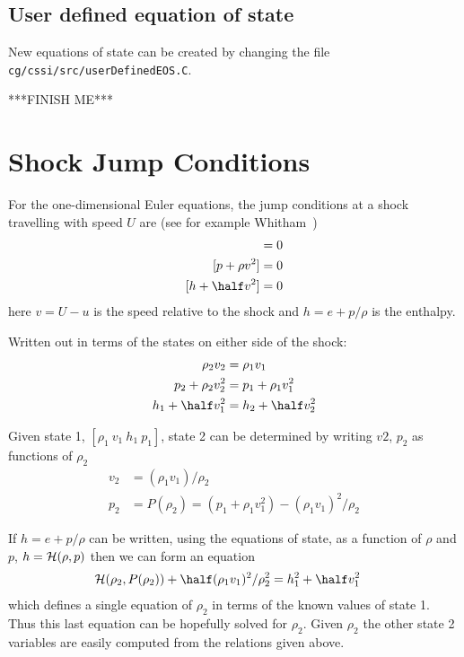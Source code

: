 \documentclass{article}
\begin{document}
\subsection{User defined equation of state} \label{sec:userDefinedEOS}

New equations of state can be created by changing the file {\tt cg/cssi/src/userDefinedEOS.C}.

***FINISH ME***



\section{Shock Jump Conditions}

For the one-dimensional Euler equations, the jump conditions at a shock travelling with speed $U$
are (see for example Whitham~\cite{Whitham74})
\begin{align*}
          [\rho v] &= 0 \\
         [p+\rho v^2] &= 0   \\
         [h+ \half v^2] &= 0   
\end{align*}
here $v=U-u$ is the speed relative to the shock and $h=e+p/\rho$ is the enthalpy.

Written out in terms of the states on either side of the shock:
\begin{align*}
          \rho_2 v_2 &= \rho_1 v_1 \\
         p_2+\rho_2 v_2^2 &= p_1+\rho_1 v_1^2   \\
         h_1+\half v_1^2 &= h_2+\half v_2^2 
\end{align*}

Given state 1, $[\rho_1~ v_1~ h_1~ p_1]$,  state 2 can be determined by writing 
$v2$, $p_2$ as functions of $\rho_2$
\begin{align*}
  v_2 &= (\rho_1 v_1)/\rho_2 \\
  p_2 &= P(\rho_2) = (p_1+\rho_1 v_1^2) - (\rho_1 v_1)^2/\rho_2
\end{align*}

If $h=e+p/\rho$ can be written, using the equations of state, as a function of $\rho$ and $p$,
$h = {\mathcal H}(\rho,p)$ then we can form an equation
\begin{align*}
  \Hc(\rho_2,P(\rho_2)) + \half (\rho_1 v_1)^2/\rho_2^2 &= h_1^2 + \half v_1^2
\end{align*}
which defines a single equation of $\rho_2$ in terms of the known values of state 1. Thus this 
last equation can be hopefully solved 
for $\rho_2$. Given $\rho_2$ the other state 2 variables are easily computed from the relations
given above.
\end{document}

